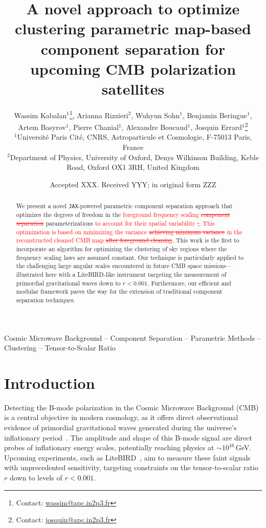 \documentclass[fleqn,usenatbib]{mnras}
\title[Optimized Clustering for CMB Component Separation]{A novel approach to optimize clustering \ar{for \sout{of}} parametric map-based component separation for upcoming CMB polarization satellites}
\author[W. Kabalan et al.]{
Wassim Kabalan$^{1}$\thanks{Contact: \href{mailto:wassim@apc.in2p3.fr}{wassim@apc.in2p3.fr}}, 
Arianna Rizzieri$^{2}$,
Wuhyun Sohn$^{1}$,
Benjamin Beringue$^{1}$,
Artem Basyrov$^{1}$,
\newauthor
Pierre Chanial$^{1}$,
Alexandre Boucaud$^{1}$,
Josquin Errard$^{1}$\thanks{Contact: \href{mailto:josquin@apc.in2p3.fr}{josquin@apc.in2p3.fr}}
\\
$^{1}$Université Paris Cité, CNRS, Astroparticule et Cosmologie, F-75013 Paris, France\\
$^{2}$Department of Physics, University of Oxford, Denys Wilkinson Building, Keble Road, Oxford OX1 3RH, United Kingdom
}
\date{Accepted XXX. Received YYY; in original form ZZZ}
\newcommand{\ar}[1]{\textcolor{red}{#1}}
\begin{document}
\label{firstpage}
\pagerange{\pageref{firstpage}--\pageref{lastpage}}
\maketitle

\begin{abstract}
We present a novel \texttt{JAX}-powered parametric component separation approach that optimizes the degrees of freedom in the \ar{foreground frequency scaling \sout{component separation}} parameterizations \ar{to account for their spatial variability \sout{,}.
This optimization is based on minimizing the variance \sout{achieving minimum variance}} \ar{in the reconstructed cleaned CMB map \sout{after foreground cleaning}}. 
This work is the first to incorporate an algorithm for optimizing the clustering of sky regions where the frequency scaling laws are assumed constant. Our technique is particularly applied to the challenging large angular scales encountered in future CMB space missions—illustrated here with a LiteBIRD-like instrument targeting the measurement of primordial gravitational waves down to \( r < 0.001 \). Furthermore, our efficient and modular framework paves the way for the extension of traditional component separation techniques.
\end{abstract}

\begin{keywords}
Cosmic Microwave Background -- Component Separation -- Parametric Methods -- Clustering -- Tensor-to-Scalar Ratio
\end{keywords}




\section{Introduction}

Detecting the B-mode polarization in the Cosmic Microwave Background (CMB) is a central objective in modern cosmology, as it offers direct observational evidence of primordial gravitational waves generated during the universe’s inflationary period~\citep{Kamionkowski1997, Seljak1997}. The amplitude and shape of this B-mode signal are direct probes of inflationary energy scales, potentially reaching physics at $\sim10^{16}$\,GeV. Upcoming experiments, such as LiteBIRD~\citep{LiteBIRD2022}, aim to measure these faint signals with unprecedented sensitivity, targeting constraints on the tensor-to-scalar ratio $r$ down to levels of $r < 0.001$.
\end{document}
